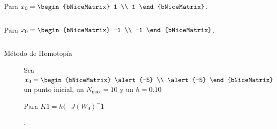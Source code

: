 \begin{frame}[fragile]
	Para
	\begin{math}
		x_{0}=
		\begin{bNiceMatrix}
			1 \\
			1
		\end{bNiceMatrix}
	\end{math}.
	\begin{center}
		\begin{minipage}{0.5\textwidth}
			\inputminted[fontsize=\tiny,firstline=1,lastline=17]{text}{resultado_pregunta_2.txt}
		\end{minipage}
	\end{center}

	Para
	\begin{math}
		x_{0}=
		\begin{bNiceMatrix}
			-1 \\
			-1
		\end{bNiceMatrix}
	\end{math}.
	\begin{center}
		\begin{minipage}{0.5\textwidth}
			\inputminted[fontsize=\tiny,firstline=18,lastline=35]{text}{resultado_pregunta_2.txt}
		\end{minipage}
	\end{center}
\end{frame}

\begin{frame}
	\begin{solution}
		\begin{description}
			\item[Método de Homotopía]
                    Sea
				\begin{math}
					x_{0}=
					\begin{bNiceMatrix}
						\alert{-5} \\
						\alert{-5}
					\end{bNiceMatrix}
				\end{math}
				un punto inicial, un
				$N_{\text{máx}}=10$ y un $h=0.10$

                Para $K1=h(-J(W_0)^-1$

				.
 		\end{description}
	\end{solution}
 \end{frame}